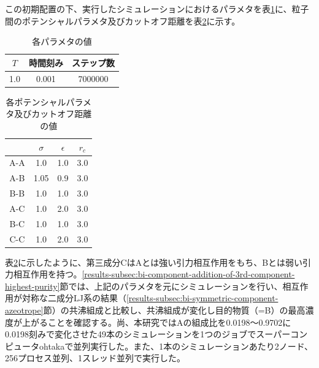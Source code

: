 \documentclass[titlepage]{jsreport}
\begin{document}
\newpage
この初期配置の下、実行したシミュレーションにおけるパラメタを表\ref{table:bi-component-addition-of-3rd-component-parameter}に、粒子間のポテンシャルパラメタ及びカットオフ距離を表\ref{table:bi-component-addition-of-3rd-component-potential-parameter}に示す。

\begin{table}[htbp]
    \begin{center}
        \caption{各パラメタの値}
        \label{table:bi-component-addition-of-3rd-component-parameter}
        \begin{tabular}{c c c}
            $T$ & 時間刻み & ステップ数 \\
            \hline
            1.0 & 0.001 & 7000000 \\
        \end{tabular}
    \end{center}
\end{table}

\begin{table}[htbp]
    \begin{center}
        \caption{各ポテンシャルパラメタ及びカットオフ距離の値}
        \label{table:bi-component-addition-of-3rd-component-potential-parameter}
        \begin{tabular}{c | c c c}
            & $\sigma$ & $\epsilon$ & $r_c$ \\
            \hline
            A-A & 1.0 & 1.0 & 3.0 \\
            A-B & 1.05 & 0.9 & 3.0 \\
            B-B & 1.0 & 1.0 & 3.0 \\
            A-C & 1.0 & 2.0 & 3.0 \\
            B-C & 1.0 & 1.0 & 3.0 \\
            C-C & 1.0 & 2.0 & 3.0
        \end{tabular}
    \end{center}
\end{table}

表\ref{table:bi-component-addition-of-3rd-component-potential-parameter}に示したように、第三成分CはAとは強い引力相互作用をもち、Bとは弱い引力相互作用を持つ。\ref{results-subsec:bi-component-addition-of-3rd-component-highest-purity}節では、上記のパラメタを元にシミュレーションを行い、相互作用が対称な二成分LJ系の結果（\ref{results-subsec:bi-symmetric-component-azeotrope}節）の共沸組成と比較し、共沸組成が変化し目的物質（=B）の最高濃度が上がることを確認する。尚、本研究ではAの組成比を0.0198〜0.9702に0.0198刻みで変化させた49本のシミュレーションを1つのジョブでスーパーコンピュータohtakaで並列実行した。また、1本のシミュレーションあたり2ノード、256プロセス並列、1スレッド並列で実行した。
\end{document}
